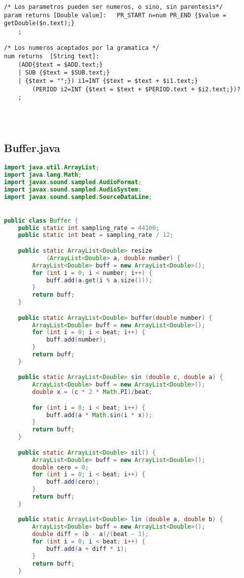\documentclass[a4paper]{article}
\begin{document}
\begin{lstlisting}[style=MyLang]
/* Los parametros pueden ser numeros, o sino, sin parentesis*/
param returns [Double value]:	PR_START n=num PR_END {$value = getDouble($n.text);}
	;

/* Los numeros aceptados por la gramatica */
num returns  [String text]:
	(ADD{$text = $ADD.text;} 
    | SUB {$text = $SUB.text;} 
    | {$text = "";}) i1=INT {$text = $text + $i1.text;} 
        (PERIOD i2=INT {$text = $text + $PERIOD.text + $i2.text;})?
	;




\end{lstlisting}
\newpage
\subsection{Buffer.java}
\begin{lstlisting}[language=Java]
import java.util.ArrayList;
import java.lang.Math;
import javax.sound.sampled.AudioFormat;
import javax.sound.sampled.AudioSystem;
import javax.sound.sampled.SourceDataLine;


public class Buffer {
    public static int sampling_rate = 44100;
    public static int beat = sampling_rate / 12;

    public static ArrayList<Double> resize
            (ArrayList<Double> a, double number) {
        ArrayList<Double> buff = new ArrayList<Double>();
        for (int i = 0; i < number; i++) {
            buff.add(a.get(i % a.size()));
        }
        return buff;
    }

    public static ArrayList<Double> buffer(double number) {
        ArrayList<Double> buff = new ArrayList<Double>();
        for (int i = 0; i < beat; i++) {
            buff.add(number);
        }
        return buff;
    }

    public static ArrayList<Double> sin (double c, double a) {
        ArrayList<Double> buff = new ArrayList<Double>();
        double x = (c * 2 * Math.PI)/beat;

        for (int i = 0; i < beat; i++) {
            buff.add(a * Math.sin(i * x));
        }
        return buff;
    }

    public static ArrayList<Double> sil() {
        ArrayList<Double> buff = new ArrayList<Double>();
        double cero = 0;
        for (int i = 0; i < beat; i++) {
            buff.add(cero);
        }
        return buff;
    }

    public static ArrayList<Double> lin (double a, double b) {
        ArrayList<Double> buff = new ArrayList<Double>();
        double diff = (b - a)/(beat - 1);
        for (int i = 0; i < beat; i++) {
            buff.add(a + diff * i);
        }
        return buff;
    }


\end{lstlisting}
\end{document}

